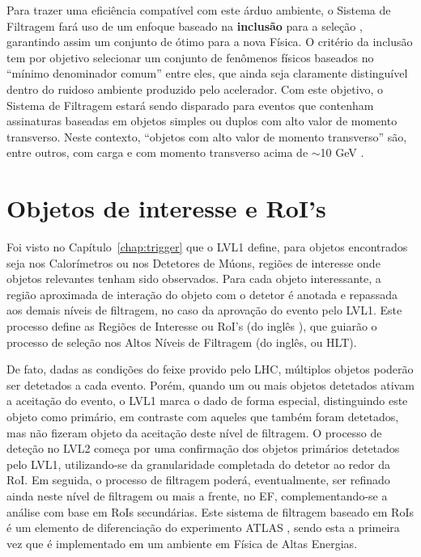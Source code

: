 Para trazer uma eficiência compatível com este árduo ambiente, o Sistema de
Filtragem fará uso de um enfoque baseado na \textbf{inclusão} para a seleção
, garantindo assim um conjunto de
 ótimo para a nova Física. O critério da inclusão tem por
objetivo selecionar um conjunto de fenômenos físicos baseados no ``mínimo
denominador comum'' entre eles, que ainda seja claramente distinguível dentro
do ruidoso ambiente produzido pelo acelerador. Com este objetivo, o Sistema de
Filtragem estará sendo disparado para eventos que contenham assinaturas
baseadas em objetos simples ou duplos com alto valor de momento
transverso. Neste contexto, ``objetos com alto valor de momento transverso''
são, entre outros,  com carga e com momento transverso acima de
$\sim$10 GeV \cite{hlt-tdr}.

\section{Objetos de interesse e RoI's}

Foi visto no Capítulo~\ref{chap:trigger} que o LVL1 define, para objetos
encontrados seja nos Calorímetros ou nos Detetores de Múons, regiões de
interesse onde objetos relevantes tenham sido observados. Para cada objeto
interessante, a região aproximada de interação do objeto com o detetor é
anotada e repassada aos demais níveis de filtragem, no caso da aprovação do
evento pelo LVL1. Este processo define as Regiões de Interesse ou RoI's (do
inglês ), que guiarão o processo de seleção nos Altos
Níveis de Filtragem (do inglês,  ou HLT).

De fato, dadas as condições do feixe provido pelo LHC, múltiplos objetos
poderão ser detetados a cada evento. Porém, quando um ou mais objetos
detetados ativam a aceitação do evento, o LVL1 marca o dado de forma especial,
distinguindo este objeto como primário, em contraste com aqueles que também
foram detetados, mas não fizeram objeto da aceitação deste nível de
filtragem. O processo de deteção no LVL2 começa por uma confirmação dos
objetos primários detetados pelo LVL1, utilizando-se da granularidade
completada do detetor ao redor da RoI. Em seguida, o processo de filtragem
poderá, eventualmente, ser refinado ainda neste nível de filtragem ou mais a
frente, no EF, complementando-se a análise com base em RoIs secundárias. Este
sistema de filtragem  baseado em RoIs é um elemento de
diferenciação do experimento ATLAS \cite{atlas-tp}, sendo esta a primeira vez
que é implementado em um ambiente em Física de Altas Energias.


